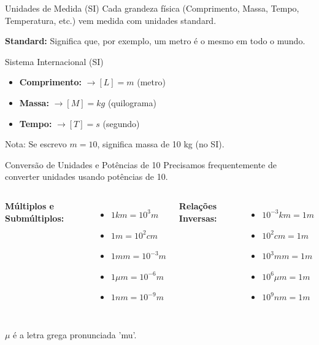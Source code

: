 \documentclass{beamer}
\begin{document}
	\begin{frame}{Unidades de Medida (SI)}
		Cada grandeza física (Comprimento, Massa, Tempo, Temperatura, etc.) vem medida com unidades standard.
		
		\textbf{Standard:} Significa que, por exemplo, um metro é o mesmo em todo o mundo.
		
		\begin{block}{Sistema Internacional (SI)}
			\begin{itemize}
				\item \textbf{Comprimento:} $\rightarrow [L] = m$ (metro)
				\item \textbf{Massa:} $\rightarrow [M] = kg$ (quilograma)
				\item \textbf{Tempo:} $\rightarrow [T] = s$ (segundo)
			\end{itemize}
		\end{block}
		
		Nota: Se escrevo $m=10$, significa massa de 10 kg (no SI).
	\end{frame}
	
	\begin{frame}{Conversão de Unidades e Potências de 10}
		Precisamos frequentemente de converter unidades usando potências de 10.
		
		\begin{columns}
			\textbf{Múltiplos e Submúltiplos:}
			\begin{itemize}
				\item $1 km = 10^3 m$
				\item $1 m = 10^2 cm$
				\item $1 mm = 10^{-3} m$
				\item $1 \mu m = 10^{-6} m$
				\item $1 nm = 10^{-9} m$
			\end{itemize}
			
			\textbf{Relações Inversas:}
			\begin{itemize}
				\item $10^{-3} km = 1 m$
				\item $10^2 cm = 1 m$
				\item $10^3 mm = 1 m$
				\item $10^6 \mu m = 1 m$
				\item $10^9 nm = 1 m$
			\end{itemize}
		\end{columns}
		
		\vspace{0.5cm}
		$\mu$ é a letra grega pronunciada 'mu'.
	\end{frame}
	
\end{document}
